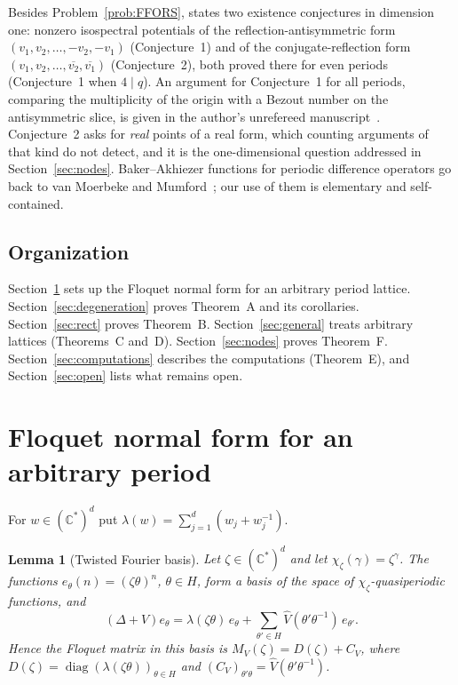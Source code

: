 \documentclass[11pt,reqno]{amsart}
\newtheorem{lemma}[theorem]{Lemma}
\theoremstyle{definition}
\theoremstyle{remark}
\newcommand{\C}{\mathbb C}
\DeclareMathOperator{\diag}{diag}
\begin{document}
Besides Problem~\ref{prob:FFORS}, \cite{FFORS2026} states two existence
conjectures in dimension one: nonzero isospectral potentials of the
reflection-antisymmetric form $(v_1,v_2,\dots,-v_2,-v_1)$ (Conjecture~1) and of
the conjugate-reflection form $(v_1,v_2,\dots,\overline{v_2},\overline{v_1})$
(Conjecture~2), both proved there for even periods (Conjecture~1 when $4\mid q$).
An argument for Conjecture~1 for all periods, comparing the multiplicity of
the origin with a Bezout number on the antisymmetric slice, is given in the
author's unrefereed manuscript~\cite[Part~13]{KeioGPT}.
Conjecture~2 asks for \emph{real} points of a real form, which counting
arguments of that kind do not detect, and it is the one-dimensional question
addressed in Section~\ref{sec:nodes}.  Baker--Akhiezer functions for periodic
difference operators go back to van Moerbeke and Mumford~\cite{vMM1979}; our
use of them is elementary and self-contained.

\subsection{Organization}
Section~\ref{sec:normal} sets up the Floquet normal form for an arbitrary
period lattice.  Section~\ref{sec:degeneration} proves Theorem~A and its
corollaries.  Section~\ref{sec:rect} proves Theorem~B.  Section~\ref{sec:general}
treats arbitrary lattices (Theorems~C and~D).  Section~\ref{sec:nodes} proves
Theorem~F.  Section~\ref{sec:computations} describes the computations
(Theorem~E), and Section~\ref{sec:open} lists what remains open.

\section{Floquet normal form for an arbitrary period}\label{sec:normal}

For $w\in(\C^*)^d$ put $\lambda(w)=\sum_{j=1}^d(w_j+w_j^{-1})$.

\begin{lemma}[Twisted Fourier basis]\label{lem:normal}
Let $\zeta\in(\C^*)^d$ and let $\chi_\zeta(\gamma)=\zeta^\gamma$.  The functions
$e_\theta(n)=(\zeta\theta)^n$, $\theta\in H$, form a basis of the space of
$\chi_\zeta$-quasiperiodic functions, and
\begin{equation}\label{eq:normal}
 (\Delta+V)e_\theta=\lambda(\zeta\theta)\,e_\theta+\sum_{\theta'\in H}\widehat V(\theta'\theta^{-1})\,e_{\theta'} .
\end{equation}
Hence the Floquet matrix in this basis is
$M_V(\zeta)=D(\zeta)+C_V$, where $D(\zeta)=\diag(\lambda(\zeta\theta))_{\theta\in H}$
and $(C_V)_{\theta'\theta}=\widehat V(\theta'\theta^{-1})$.
\end{lemma}
\end{document}
